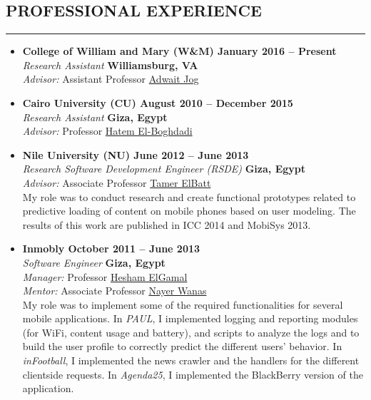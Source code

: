 \documentclass[10pt,a4]{article}
\begin{document}
\subsection*{PROFESSIONAL EXPERIENCE}
\hrule
\vspace{0.2cm}
\begin{itemize}

\item{\bf College of William and Mary (W\&M) \hfill {\bf January 2016 -- Present}}\\
{\it Research Assistant} \hfill {\bf Williamsburg, VA}\\
{\it Advisor:} Assistant Professor \href{http://www.cs.wm.edu/~adwait/}{Adwait Jog} 

\item{\bf Cairo University (CU) \hfill {\bf August 2010 -- December 2015}}\\
{\it Research Assistant} \hfill {\bf Giza, Egypt}\\
{\it Advisor:} Professor \href{http://scholar.cu.edu.eg/?q=helboghdadi}{Hatem El-Boghdadi}

\item{\bf Nile University (NU) \hfill {\bf June 2012 -- June 2013}}\\
{\it Research Software Development Engineer (RSDE)} \hfill {\bf Giza, Egypt}\\
{\it Advisor:} Associate Professor \href{https://sites.google.com/site/telbatt/}{Tamer ElBatt}\\
My role was to conduct research and create functional prototypes related to predictive loading of content on mobile phones based on user modeling. The results of this work are published in ICC 2014 and MobiSys 2013. 

\item{\bf Inmobly \hfill {\bf October 2011 -- June 2013}}\\
{\it Software Engineer} \hfill {\bf Giza, Egypt}\\
{\it Manager:} Professor \href{https://ece.osu.edu/people/elgamal}{Hesham ElGamal}\\ 
{\it Mentor:} Associate Professor \href{https://eg.linkedin.com/in/nwanas}{Nayer Wanas}\\
My role was to implement some of the required functionalities for several mobile applications. In {\it PAUL}, I implemented logging and reporting modules (for Wi­Fi, content usage and battery), and scripts to analyze the logs and to build the user profile to correctly predict the different users' behavior. In {\it inFootball}, I implemented the news crawler and the handlers for the different client­side requests. In {\it Agenda25}, I implemented the BlackBerry version of the application.


\end{itemize}
\end{document}
